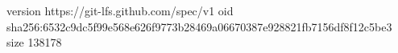 version https://git-lfs.github.com/spec/v1
oid sha256:6532c9dc5f99e568e626f9773b28469a06670387e928821fb7156df8f12c5be3
size 138178
